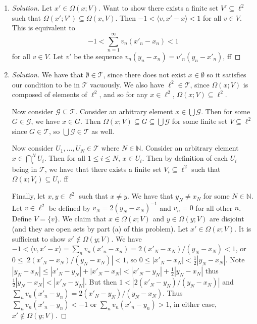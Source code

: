 \documentclass{article}
\newcommand{\N}{{\mathbb N}}
\begin{document}
\begin{enumerate}
	\item \begin{proof}[Solution]\let\qed\relax
		Let $x' \in \Omega(x;V)$.
		Want to show there exists a finite set $V' \subseteq \ell^2$
		such that $\Omega(x';V') \subseteq \Omega(x,V)$.
		Then $-1 < \langle v, x' - x \rangle < 1$ for all $v \in V$.
		This is equivalent to
		\[
			-1 < \sum_{n = 1}^\infty v_n(x'_n - x_n) < 1
		\]
		for all $v \in V$.
		Let $v'$ be the sequence $v_n(y_n - x_n) = v'_n(y_n - x'_n)$,
		ff
	\end{proof}
	\item \begin{proof}[Solution]\let\qed\relax
		We have that $\emptyset \in \mathcal{T}$,
		since there does not exist $x \in \emptyset$ so it
		satisfies our condition to be in $\mathcal{T}$ vacuously.
		We also have $\ell^2 \in \mathcal{T}$,
		since $\Omega(x;V)$ is composed of elements of $\ell^2$,
		and so for any $x \in \ell^2$, $\Omega(x;V) \subseteq \ell^2$.
		
		Now consider $\mathcal{G} \subseteq \mathcal{T}$.
		Consider an arbitrary element $x \in \bigcup \mathcal{G}$.
		Then for some $G \in \mathcal{G}$, we have $x \in G$.
		Then $\Omega(x;V) \subseteq G \subseteq \bigcup\mathcal{G}$
		for some finite set $V \subseteq \ell^2$ since $G \in \mathcal{T}$,
		so $\bigcup \mathcal{G} \in \mathcal{T}$ as well.

		Now consider $U_1,\dots,U_N \in \mathcal{T}$ where $N \in \N$.
		Consider an arbitrary element $x \in \bigcap_i^N U_i$.
		Then for all $1 \leq i \leq N$, $x \in U_i$.
		Then by definition of each $U_i$ being in $\mathcal{T}$,
		we have that there exists a finite set $V_i \subseteq \ell^2$
		such that $\Omega(x;V_i) \subseteq U_i$.
		ff

		Finally, let $x, y \in \ell^2$ such that $x \neq y$.
		We have that $y_N \neq x_N$ for some $N \in \N$.
		Let $v \in \ell^2$ be defined by
		$v_N = 2(y_N - x_N)^{-1}$ and $v_n = 0$ for all other $n$.
		Define $V = \{v\}$.
		We claim that $x\in\Omega(x;V)$ and $y\in\Omega(y;V)$ are disjoint
		(and they are open sets by part (a) of this problem).
		Let $x' \in \Omega(x;V)$.
		It is sufficient to show $x' \not\in \Omega(y;V)$.
		We have $-1 < \langle v, x' - x \rangle =
		\sum_n v_n(x'_n - x_n) = 2(x'_N - x_N)/(y_N - x_N) < 1$,
		or $0 \leq |2(x'_N - x_N)/(y_N - x_N)| < 1$,
		so $0 \leq |x'_N - x_N| < \frac12|y_N - x_N|$.
		Note $|y_N - x_N| \leq |x'_N - y_N| + |x'_N - x_N| < |x'_N - y_N| + \frac12|y_N - x_N|$
		thus $\frac12|y_N - x_N| < |x'_N - y_N|$.
		But then $1 < |2(x'_N - y_N)/(y_N - x_N)|$
		and $\sum_n v_n(x'_n - y_n) = 2(x'_N - y_N)/(y_N-x_N)$.
		Thus $\sum_n v_n(x'_n - y_n) < -1$ or $\sum_n v_n(x'_n - y_n) > 1$,
		in either case, $x' \not\in \Omega(y;V)$.


\end{proof}
\end{enumerate}
\end{document}

